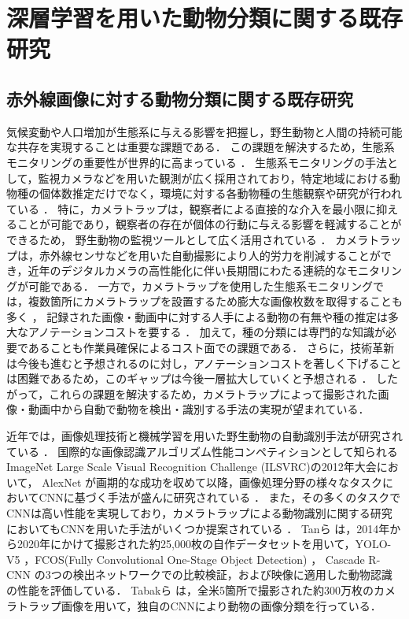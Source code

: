 
\chapter{深層学習を用いた動物分類に関する既存研究}

\section{赤外線画像に対する動物分類に関する既存研究}

気候変動や人口増加が生態系に与える影響を把握し，野生動物と人間の持続可能な共存を実現することは重要な課題である．
この課題を解決するため，生態系モニタリングの重要性が世界的に高まっている \cite{zwerts2021, bandaru2024}．
生態系モニタリングの手法として，監視カメラなどを用いた観測が広く採用されており，特定地域における動物種の個体数推定だけでなく，環境に対する各動物種の生態観察や研究が行われている \cite{trolliet2014}．
特に，カメラトラップは，観察者による直接的な介入を最小限に抑えることが可能であり，観察者の存在が個体の行動に与える影響を軽減することができるため，
野生動物の監視ツールとして広く活用されている \cite{本郷2018, abood2023}．
カメラトラップは，赤外線センサなどを用いた自動撮影により人的労力を削減することができ，近年のデジタルカメラの高性能化に伴い長期間にわたる連続的なモニタリングが可能である．
一方で，カメラトラップを使用した生態系モニタリングでは，複数箇所にカメラトラップを設置するため膨大な画像枚数を取得することも多く \cite{kays2020, si2014}，
記録された画像・動画中に対する人手による動物の有無や種の推定は多大なアノテーションコストを要する \cite{thangaraj2023}．
加えて，種の分類には専門的な知識が必要であることも作業員確保によるコスト面での課題である．
さらに，技術革新は今後も進むと予想されるのに対し，アノテーションコストを著しく下げることは困難であるため，このギャップは今後一層拡大していくと予想される \cite{安藤2019}．
したがって，これらの課題を解決するため，カメラトラップによって撮影された画像・動画中から自動で動物を検出・識別する手法の実現が望まれている．

近年では，画像処理技術と機械学習を用いた野生動物の自動識別手法が研究されている \cite{manna2023, mohanty2022}．
国際的な画像認識アルゴリズム性能コンペティションとして知られるImageNet Large Scale Visual Recognition Challenge (ILSVRC)の2012年大会において，
AlexNet \cite{alexnet}が画期的な成功を収めて以降，画像処理分野の様々なタスクにおいてCNNに基づく手法が盛んに研究されている \cite{mohanty2016, sue2020}．
また，その多くのタスクでCNNは高い性能を実現しており，カメラトラップによる動物識別に関する研究においてもCNNを用いた手法がいくつか提案されている \cite{agarwal2023, neeli2023, thangaraj2023, abood2023}．
Tanら \cite{tan2022}は，2014年から2020年にかけて撮影された約25,000枚の自作データセットを用いて，YOLO-V5 \cite{yolov5}，FCOS(Fully Convolutional One-Stage Object Detection) \cite{fcos}，
Cascade R-CNN \cite{cascade}の3つの検出ネットワークでの比較検証，および映像に適用した動物認識の性能を評価している．
Tabakら \cite{tabak2019}は，全米5箇所で撮影された約300万枚のカメラトラップ画像を用いて，独自のCNNにより動物の画像分類を行っている．

